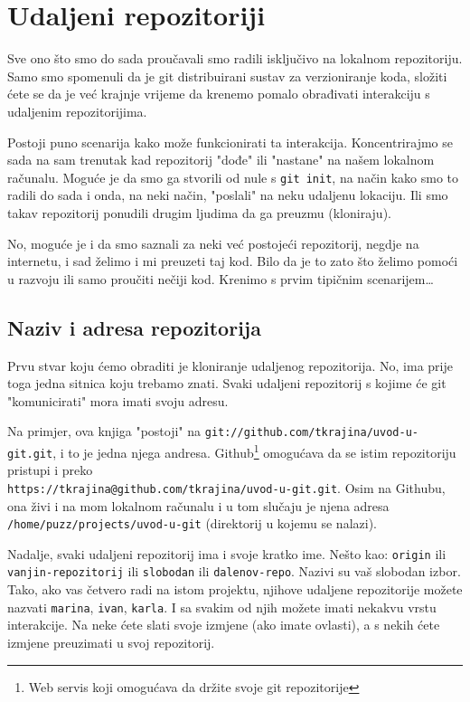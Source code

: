 \chapter*{Udaljeni repozitoriji}

Sve ono što smo do sada proučavali smo radili isključivo na lokalnom repozitoriju.
Samo smo spomenuli da je git distribuirani sustav za verzioniranje koda, složiti ćete se da je već krajnje vrijeme da krenemo pomalo obrađivati interakciju s udaljenim repozitorijima.

Postoji puno scenarija kako može funkcionirati ta interakcija.
Koncentrirajmo se sada na sam trenutak kad repozitorij "dođe" ili "nastane" na našem lokalnom računalu.
Moguće je da smo ga stvorili od nule s \verb+git init+, na način kako smo to radili do sada i onda, na neki način, "poslali" na neku udaljenu lokaciju.
Ili smo takav repozitorij ponudili drugim ljudima da ga preuzmu (kloniraju).

No, moguće je i da smo saznali za neki već postojeći repozitorij, negdje na internetu, i sad želimo i mi preuzeti taj kod.
Bilo da je to zato što želimo pomoći u razvoju ili samo proučiti nečiji kod.
Krenimo s prvim tipičnim scenarijem\dots

\section*{Naziv i adresa repozitorija}

Prvu stvar koju ćemo obraditi je kloniranje udaljenog repozitorija.
No, ima prije toga jedna sitnica koju trebamo znati.
Svaki udaljeni repozitorij s kojime će git "komunicirati" mora imati svoju adresu.

Na primjer, ova knjiga "postoji" na \verb+git://github.com/tkrajina/uvod-u-git.git+, i to je jedna njega andresa.
Github\footnote{Web servis koji omogućava da držite svoje git repozitorije} omogućava da se istim repozitoriju pristupi i preko \\ \verb+https://tkrajina@github.com/tkrajina/uvod-u-git.git+.
Osim na Githubu, ona živi i na mom lokalnom računalu i u tom slučaju je njena adresa \verb+/home/puzz/projects/uvod-u-git+ (direktorij u kojemu se nalazi).

Nadalje, svaki udaljeni repozitorij ima i svoje kratko ime.
Nešto kao: \verb+origin+ ili \\ \verb+vanjin-repozitorij+ ili \verb+slobodan+ ili \verb+dalenov-repo+.
Nazivi su vaš slobodan izbor. 
Tako, ako vas četvero radi na istom projektu, njihove udaljene repozitorije možete nazvati \verb+marina+, \verb+ivan+, \verb+karla+.
I sa svakim od njih možete imati nekakvu vrstu interakcije. 
Na neke ćete slati svoje izmjene (ako imate ovlasti), a s nekih ćete izmjene preuzimati u svoj repozitorij.

